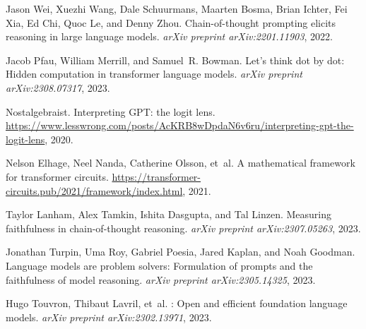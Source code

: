 \documentclass{article}
\begin{document}
\begin{thebibliography}{9}

Jason Wei, Xuezhi Wang, Dale Schuurmans, Maarten Bosma, Brian Ichter, Fei Xia, Ed Chi, Quoc Le, and Denny Zhou.
\newblock Chain-of-thought prompting elicits reasoning in large language models.
\newblock \emph{arXiv preprint arXiv:2201.11903}, 2022.

Jacob Pfau, William Merrill, and Samuel~R. Bowman.
\newblock Let's think dot by dot: Hidden computation in transformer language models.
\newblock \emph{arXiv preprint arXiv:2308.07317}, 2023.

Nostalgebraist.
\newblock Interpreting {GPT}: the logit lens.
\newblock \url{https://www.lesswrong.com/posts/AcKRB8wDpdaN6v6ru/interpreting-gpt-the-logit-lens}, 2020.

Nelson Elhage, Neel Nanda, Catherine Olsson, et~al.
\newblock A mathematical framework for transformer circuits.
\newblock \url{https://transformer-circuits.pub/2021/framework/index.html}, 2021.

Taylor Lanham, Alex Tamkin, Ishita Dasgupta, and Tal Linzen.
\newblock Measuring faithfulness in chain-of-thought reasoning.
\newblock \emph{arXiv preprint arXiv:2307.05263}, 2023.

Jonathan Turpin, Uma Roy, Gabriel Poesia, Jared Kaplan, and Noah Goodman.
\newblock Language models are problem solvers: Formulation of prompts and the faithfulness of model reasoning.
\newblock \emph{arXiv preprint arXiv:2305.14325}, 2023.

Hugo Touvron, Thibaut Lavril, et~al.
: Open and efficient foundation language models.
\newblock \emph{arXiv preprint arXiv:2302.13971}, 2023.

\end{thebibliography}
\end{document}
